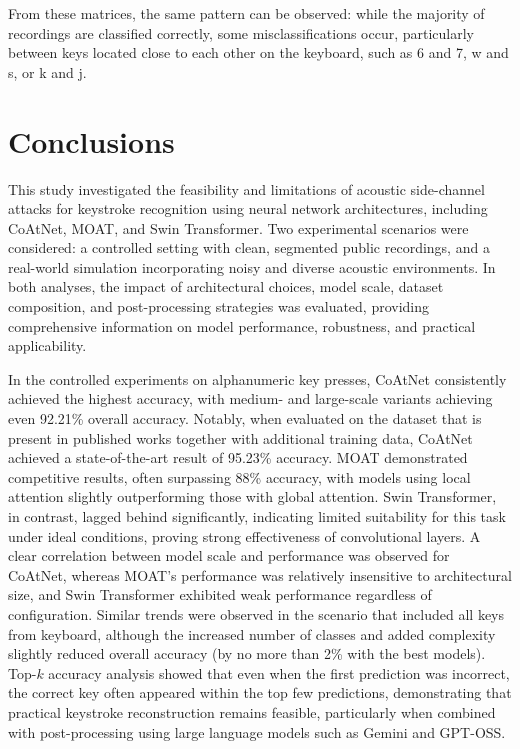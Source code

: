 \documentclass[a4paper,11pt,twoside]{report}
\theoremstyle{definition}
\begin{document}
From these matrices, the same pattern can be observed: while the majority of recordings are classified correctly, some misclassifications occur, particularly between keys located close to each other on the keyboard, such as 6 and 7, w and s, or k and j.


\chapter{Conclusions}

This study investigated the feasibility and limitations of acoustic side-channel attacks for keystroke recognition using neural network architectures, including CoAtNet, MOAT, and Swin Transformer. Two experimental scenarios were considered: a controlled setting with clean, segmented public recordings, and a real-world simulation incorporating noisy and diverse acoustic environments. In both analyses, the impact of architectural choices, model scale, dataset composition, and post-processing strategies was evaluated, providing comprehensive information on model performance, robustness, and practical applicability.

In the controlled experiments on alphanumeric key presses, CoAtNet consistently achieved the highest accuracy, with medium- and large-scale variants achieving even 92.21\% overall accuracy. Notably, when evaluated on the dataset that is present in published works together with additional training data, CoAtNet achieved a state-of-the-art result of 95.23\% accuracy. MOAT demonstrated competitive results, often surpassing 88\% accuracy, with models using local attention slightly outperforming those with global attention. Swin Transformer, in contrast, lagged behind significantly, indicating limited suitability for this task under ideal conditions, proving strong effectiveness of convolutional layers. A clear correlation between model scale and performance was observed for CoAtNet, whereas MOAT’s performance was relatively insensitive to architectural size, and Swin Transformer exhibited weak performance regardless of configuration. Similar trends were observed in the scenario that included all keys from keyboard, although the increased number of classes and added complexity slightly reduced overall accuracy (by no more than 2\% with the best models). Top-$k$ accuracy analysis showed that even when the first prediction was incorrect, the correct key often appeared within the top few predictions, demonstrating that practical keystroke reconstruction remains feasible, particularly when combined with post-processing using large language models such as Gemini and GPT-OSS.
\end{document}
